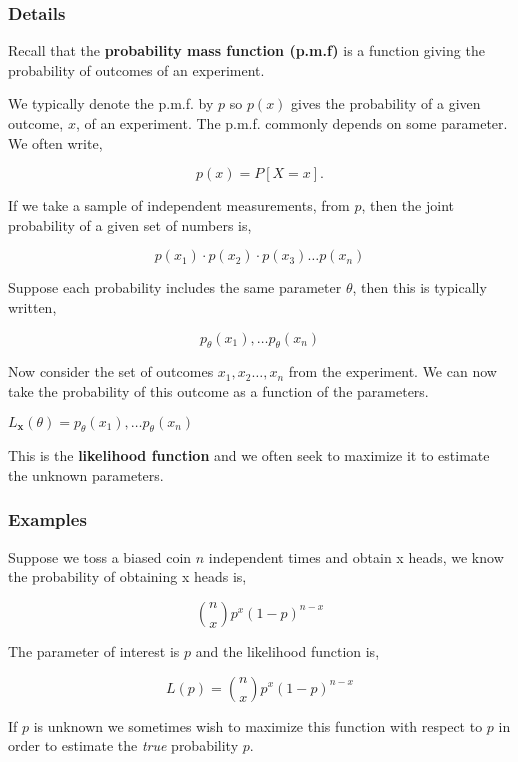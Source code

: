 \documentclass[12pt,a4paper]{article}
\theoremstyle{regla}
\theoremstyle{remark}
\theoremstyle{definition}
\theoremstyle{nonumberbreak}
\begin{document}
\subsubsection{Details}
\begin{defn}
Recall that the {\bf probability mass function (p.m.f)} is a function giving the probability of outcomes of an experiment.\\
\end{defn}
We typically denote the p.m.f. by $p$ so $p(x)$ gives the probability of a given outcome, $x$, of an experiment. The p.m.f.  commonly depends on some parameter. We often write,

$$ p(x) = P [X = x].$$

If we take a sample of independent measurements, from $p$, then the joint probability of a given set of numbers is, 

$$ p(x_1) \cdot p(x_2) \cdot p(x_3) \ldots p(x_n)$$

 

Suppose each probability includes the same parameter $\theta$, then this is typically written,

$$ {p_{\theta}}(x_1),  \ldots {p_{\theta}}(x_n)$$

 

Now consider the set of outcomes $ x_1, x_2 \ldots, x_n$ from the experiment. We can now take the probability of this outcome as a function of the parameters.
\begin{defn}
$ L_{\mathbf{x}}(\theta) = p_{\theta}(x_1),  \ldots p_{\theta}(x_n)$ 

This is the \textbf{likelihood function} and we often seek to maximize it to estimate the unknown parameters.
\end{defn}
\subsubsection{Examples}
\begin{xmpl}
Suppose we toss a biased coin $n$ independent times and obtain x heads, we know the probability of obtaining x heads is,

$$\binom{n}{x}p^x (1-p)^{n-x}$$

The parameter of interest is $p$ and the likelihood function is,

$$ L(p) = \binom{n}{x}p^x (1-p)^{n-x}$$

If $p$ is unknown we sometimes wish to maximize this function with respect to $p$ in order to estimate the \emph{true} probability $p$.
\end{xmpl}
\end{document}
